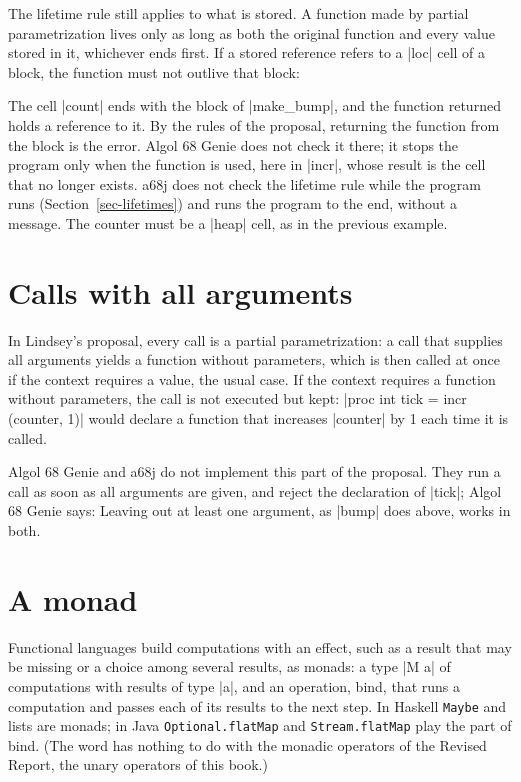 \begin{pitfall}
The lifetime rule still applies to what is stored. A function made by
partial parametrization lives only as long as both the original function
and every value stored in it, whichever ends first. If a stored reference refers to a \code|loc| cell of a
block, the function must not outlive that block:


\noindent The cell \code|count| ends with the block of
\code|make_bump|, and the function returned holds a reference to it. By
the rules of the proposal, returning the function from the block is the
error. Algol 68 Genie does not check it there; it stops the program only
when the function is used, here in \code|incr|, whose result is the cell
that no longer exists. a68j does not check the lifetime rule while the
program runs (Section~\ref{sec-lifetimes}) and runs the program to the
end, without a message. The counter must be a \code|heap| cell, as in the
previous example.
\end{pitfall}

\section*{Calls with all arguments}

In Lindsey's proposal, every call is a partial parametrization: a call
that supplies all arguments yields a function without parameters, which
is then called at once if the context requires a value, the usual case.
If the context requires a function without parameters, the call is not
executed but kept: \code|proc int tick = incr (counter, 1)| would declare
a function that increases \code|counter| by 1 each time it is called.

\begin{implnote}
Algol 68 Genie and a68j do not implement this part of the proposal. They
run a call as soon as all arguments are given, and reject the declaration
of \code|tick|; Algol 68 Genie says:
\noindent Leaving out at least one argument, as \code|bump| does above,
works in both.
\end{implnote}

\section*{A monad}

Functional languages build computations with an effect, such as a result
that may be missing or a choice among several results, as monads: a type
\code|M a| of computations with results of type \code|a|, and an
operation, bind, that runs a computation and passes each of its results
to the next step. In Haskell \texttt{Maybe} and lists are monads; in Java
\texttt{Optional.flatMap} and \texttt{Stream.flatMap} play the part of
bind. (The word has nothing to do with the monadic operators of the
Revised Report, the unary operators of this book.)

